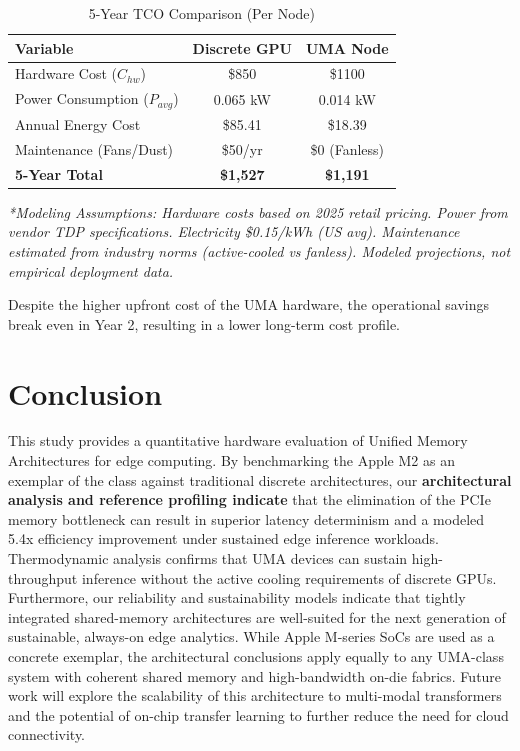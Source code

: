\documentclass[conference]{IEEEtran}
\begin{document}
\begin{table}[htbp]
\caption{5-Year TCO Comparison (Per Node)}
\begin{center}
\begin{tabular}{lcc}
\toprule
\textbf{Variable} & \textbf{Discrete GPU} & \textbf{UMA Node} \\
\midrule
Hardware Cost ($C_{hw}$) & \$850 & \$1100 \\
Power Consumption ($P_{avg}$) & 0.065 kW & 0.014 kW \\
Annual Energy Cost & \$85.41 & \$18.39 \\
Maintenance (Fans/Dust) & \$50/yr & \$0 (Fanless) \\
\textbf{5-Year Total} & \textbf{\$1,527} & \textbf{\$1,191} \\
\bottomrule
\end{tabular}
\end{center}
\textit{*Modeling Assumptions: Hardware costs based on 2025 retail pricing. Power from vendor TDP specifications. Electricity \$0.15/kWh (US avg). Maintenance estimated from industry norms (active-cooled vs fanless). Modeled projections, not empirical deployment data.}
\label{tab:tco}
\end{table}

Despite the higher upfront cost of the UMA hardware, the operational savings break even in Year 2, resulting in a lower long-term cost profile.

\section{Conclusion}
This study provides a quantitative hardware evaluation of Unified Memory Architectures for edge computing. By benchmarking the Apple M2 as an exemplar of the class against traditional discrete architectures, our \textbf{architectural analysis and reference profiling indicate} that the elimination of the PCIe memory bottleneck can result in superior latency determinism and a modeled 5.4x efficiency improvement under sustained edge inference workloads. Thermodynamic analysis confirms that UMA devices can sustain high-throughput inference without the active cooling requirements of discrete GPUs. Furthermore, our reliability and sustainability models indicate that tightly integrated shared-memory architectures are well-suited for the next generation of sustainable, always-on edge analytics. While Apple M-series SoCs are used as a concrete exemplar, the architectural conclusions apply equally to any UMA-class system with coherent shared memory and high-bandwidth on-die fabrics. Future work will explore the scalability of this architecture to multi-modal transformers \cite{b42, b43} and the potential of on-chip transfer learning to further reduce the need for cloud connectivity.
\end{document}
